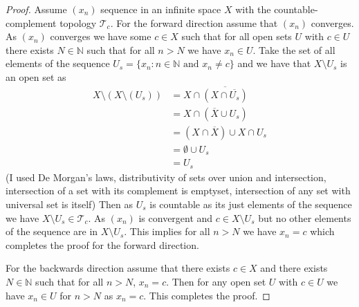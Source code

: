 \documentclass{amsart}
\theoremstyle{plain}
\theoremstyle{definition}
\theoremstyle{remark}
\begin{document}
\begin{proof}
    Assume $(x_n)$ sequence in an infinite space $X$ with the countable-complement topology $\mathcal{T}_c$. For the forward direction assume that $(x_n)$ converges. As $(x_n)$ converges we have some $c\in X$ such that for all open sets $U$ with $c\in U$ there exists $N\in \mathbb{N}$ such that for all $n>N$ we have $x_n\in U$. Take the set of all elements of the sequence $U_s=\{x_n: n\in \mathbb{N}\text{ and }x_n\not = c \}$ and we have that $X\setminus U_s$ is an open set as 
    \begin{align*}
        X\setminus (X \setminus(U_s ))& = X \cap \overline{(X \cap \overline{U_s})}\\
        &=X \cap (\overline{X}\cup U_s)\\
        &= (X\cap \overline X) \cup X\cap U_s\\
        &= \emptyset \cup U_s\\
        &= U_s
    \end{align*}
    (I used De Morgan's laws, distributivity of sets over union and intersection, intersection of a set with its complement is emptyset, intersection of any set with universal set is itself)
    Then as $U_s$ is countable as its just elements of the sequence we have $X\setminus U_s\in \mathcal{T}_c$. As $(x_n)$ is convergent and $c\in X\setminus U_s$ but no other elements of the sequence are in $X\setminus U_s$. This implies for all $n>N$ we have $x_n=c$ which completes the proof for the forward direction. 

    For the backwards direction assume that there exists $c\in X$ and there exists $N\in \mathbb{N}$ such that for all $n>N$, $x_n=c$. Then for any open set $U$ with $c\in U$ we have $x_n\in U$ for $n>N$ as $x_n=c$. This completes the proof.

\end{proof}
\end{document}
